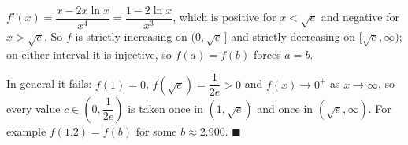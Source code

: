 $f'(x)=\dfrac{x-2x\ln x}{x^4}=\dfrac{1-2\ln x}{x^3}$, which is positive for $x<\sqrt e$ and negative for $x>\sqrt e$. So $f$ is strictly increasing on $(0,\sqrt e\,]$ and strictly decreasing on $[\sqrt e,\infty)$; on either interval it is injective, so $f(a)=f(b)$ forces $a=b$.

In general it fails: $f(1)=0$, $f(\sqrt e)=\dfrac1{2e}>0$ and $f(x)\to0^+$ as $x\to\infty$, so every value $c\in\left(0,\dfrac1{2e}\right)$ is taken once in $(1,\sqrt e)$ and once in $(\sqrt e,\infty)$. For example $f(1.2)=f(b)$ for some $b\approx2.900$. $\blacksquare$
